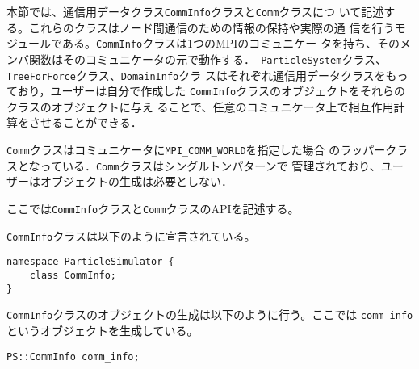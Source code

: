 本節では、通信用データクラス{\tt CommInfo}クラスと{\tt Comm}クラスにつ
いて記述する。これらのクラスはノード間通信のための情報の保持や実際の通
信を行うモジュールである。{\tt CommInfo}クラスは1つのMPIのコミュニケー
タを持ち、そのメンバ関数はそのコミュニケータの元で動作する．{\tt
ParticleSystem}クラス、{\tt TreeForForce}クラス、{\tt DomainInfo}クラ
スはそれぞれ通信用データクラスをもっており，ユーザーは自分で作成した
{\tt CommInfo}クラスのオブジェクトをそれらのクラスのオブジェクトに与え
ることで、任意のコミュニケータ上で相互作用計算をさせることができる．

{\tt Comm}クラスはコミュニケータに{\tt MPI\_COMM\_WORLD}を指定した場合
のラッパークラスとなっている．{\tt Comm}クラスはシングルトンパターンで
管理されており、ユーザーはオブジェクトの生成は必要としない．

ここでは{\tt CommInfo}クラスと{\tt Comm}クラスのAPIを記述する。


{\tt CommInfo}クラスは以下のように宣言されている。
\begin{lstlisting}[caption=CommInfo0]
namespace ParticleSimulator {
    class CommInfo;
}
\end{lstlisting}

{\tt CommInfo}クラスのオブジェクトの生成は以下のように行う。ここでは
{\tt comm\_info}というオブジェクトを生成している。
\begin{screen}
\begin{verbatim}
PS::CommInfo comm_info;
\end{verbatim}
\end{screen}



